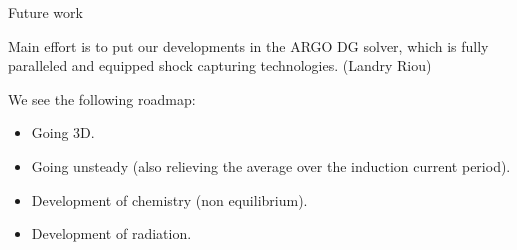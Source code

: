 \documentclass[24pt,t,table, aspectratio=169]{beamer}
\begin{document}
\begin{frame}{Future work}

Main effort is to put our developments in the ARGO DG solver, which is fully paralleled and equipped shock capturing technologies. (Landry Riou)

We see the following roadmap:
\begin{itemize}
\item Going 3D.

\item Going unsteady (also relieving the average over the induction current period).

\item Development of chemistry (non equilibrium).

\item Development of radiation.

\end{itemize}


\end{frame}
\end{document}
